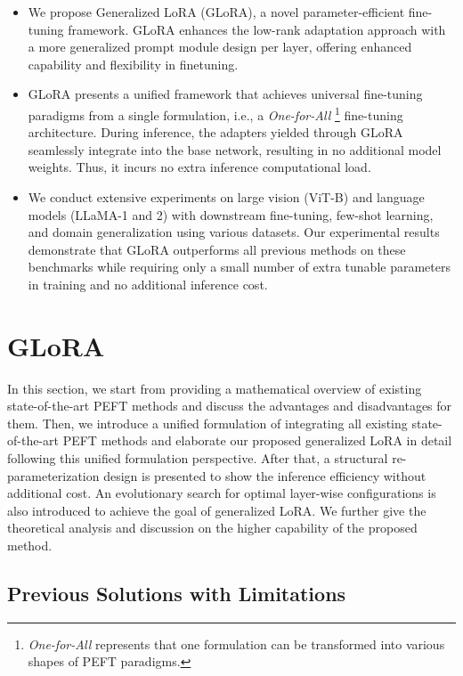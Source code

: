 \begin{itemize}
\addtolength{\itemsep}{-0.0in}
\item {We propose Generalized LoRA (GLoRA), a novel parameter-efficient fine-tuning framework. GLoRA enhances the low-rank adaptation approach with a more generalized prompt module design per layer, offering enhanced capability and flexibility in finetuning.}
\item {GLoRA presents a unified framework that achieves universal fine-tuning paradigms from a single formulation, i.e., a {\em One-for-All} \footnote{{\em One-for-All} represents that one formulation can be transformed into various shapes of PEFT paradigms.} fine-tuning architecture. During inference, the adapters yielded through GLoRA seamlessly integrate into the base network, resulting in no additional model weights. Thus, it incurs no extra inference computational load.}
\item {We conduct extensive experiments on large vision (ViT-B) and language models (LLaMA-1 and 2) with downstream fine-tuning, few-shot learning, and domain generalization using various datasets. Our experimental results demonstrate that GLoRA outperforms all previous methods on these benchmarks while requiring only a small number of extra tunable parameters in training and no additional inference cost.}
\end{itemize}

\section{GLoRA}

In this section, we start from providing a mathematical overview of existing state-of-the-art PEFT methods and discuss the advantages and disadvantages for them. Then, we introduce a unified formulation of integrating all existing state-of-the-art PEFT methods and elaborate our proposed generalized LoRA in detail following this unified formulation perspective. After that, a structural re-parameterization design is presented to show the inference efficiency without additional cost. An evolutionary search for optimal layer-wise configurations is also introduced to achieve the goal of generalized LoRA. We further give the theoretical analysis and discussion on the higher capability of the proposed method.

\subsection{Previous Solutions with Limitations}


